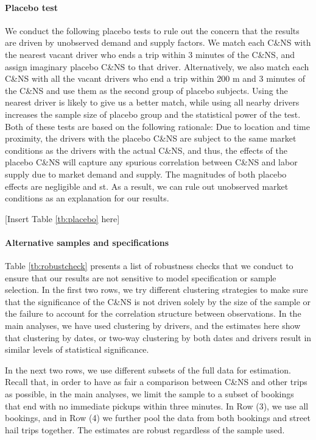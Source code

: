 \documentclass[reviewmode,AEJ]{AEA}
\begin{document}
\paragraph{Placebo test}
We conduct the following placebo tests to rule out the concern that the results are driven by unobserved demand and supply factors. We match each C\&NS with the nearest vacant driver who ends a trip within 3 minutes of the C\&NS, and assign imaginary placebo C\&NS to that driver. Alternatively, we also match each C\&NS with all the vacant drivers who end a trip within 200 m and 3 minutes of the C\&NS and use them as the second group of placebo subjects. Using the nearest driver is likely to give us a better match, while using all nearby drivers increases the sample size of placebo group and the statistical power of the test. Both of these tests are based on the following rationale: Due to location and time proximity, the drivers with the placebo C\&NS are subject to the same market conditions as the drivers with the actual C\&NS, and thus, the effects of the placebo C\&NS will capture any spurious correlation between C\&NS and labor supply due to market demand and supply. The magnitudes of both placebo effects are negligible and st. As a result, we can rule out unobserved market conditions as an explanation for our results.

\begin{center}
    [Insert Table \ref{tb:placebo} here]
\end{center}


\paragraph{Alternative samples and specifications} Table \ref{tb:robustcheck} presents a list of robustness checks that we conduct to ensure that our results are not sensitive to model specification or sample selection. In the first two rows, we try different clustering strategies  to make sure that the significance of the C\&NS is not driven solely by the size of the sample or the failure to account for the correlation structure between observations. In the main analyses, we have used clustering by drivers, and the estimates here show that clustering by dates, or two-way clustering by both dates and drivers result in similar levels of statistical significance. 

In the next two rows, we use different subsets of the full data for estimation. Recall that, in order to have as fair a comparison between C\&NS and other trips as possible, in the main analyses, we limit the sample to a subset of bookings that end with no immediate pickups within three minutes. In Row (3), we use all bookings, and in Row (4) we further pool the data from both bookings and street hail trips together. The estimates are robust regardless of the sample used.
\end{document}
